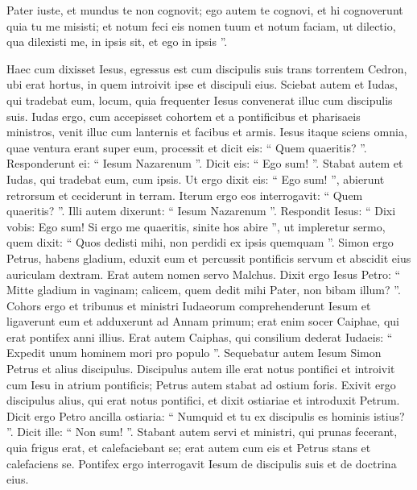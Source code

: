 \begin{biblechapter}
\begin{biblechapter}
\begin{biblechapter}
\begin{biblechapter}
\begin{biblechapter}
\begin{biblechapter}
\begin{biblechapter}
\begin{biblechapter}
\begin{biblechapter}
\begin{biblechapter}
\begin{biblechapter}
\begin{biblechapter}
\begin{biblechapter}
\begin{biblechapter}
\begin{biblechapter}
\begin{biblechapter}
\begin{biblechapter}
 \verse Pater iuste, et mundus te non cognovit; ego autem te cognovi, et hi cognoverunt quia tu me misisti; 
\verse et notum feci eis nomen tuum et notum faciam, ut dilectio, qua dilexisti me, in ipsis sit, et ego in ipsis ”.
 
\begin{biblechapter}
\verse Haec cum dixisset Iesus, egressus est cum discipulis suis trans torrentem Cedron, ubi erat hortus, in quem introivit ipse et discipuli eius. 
\verse Sciebat autem et Iudas, qui tradebat eum, locum, quia frequenter Iesus convenerat illuc cum discipulis suis. 
\verse Iudas ergo, cum accepisset cohortem et a pontificibus et pharisaeis ministros, venit illuc cum lanternis et facibus et armis. 
\verse Iesus itaque sciens omnia, quae ventura erant super eum, processit et dicit eis: “ Quem quaeritis? ”. 
\verse Responderunt ei: “ Iesum Nazarenum ”. Dicit eis: “ Ego sum! ”. Stabat autem et Iudas, qui tradebat eum, cum ipsis. 
\verse Ut ergo dixit eis: “ Ego sum! ”, abierunt retrorsum et ceciderunt in terram. 
\verse Iterum ergo eos interrogavit: “ Quem quaeritis? ”. Illi autem dixerunt: “ Iesum Nazarenum ”. 
\verse Respondit Iesus: “ Dixi vobis: Ego sum! Si ergo me quaeritis, sinite hos abire ”, 
\verse ut impleretur sermo, quem dixit: “ Quos dedisti mihi, non perdidi ex ipsis quemquam ”. 
\verse Simon ergo Petrus, habens gladium, eduxit eum et percussit pontificis servum et abscidit eius auriculam dextram. Erat autem nomen servo Malchus. 
\verse Dixit ergo Iesus Petro: “ Mitte gladium in vaginam; calicem, quem dedit mihi Pater, non bibam illum? ”.
 \verse Cohors ergo et tribunus et ministri Iudaeorum comprehenderunt Iesum et ligaverunt eum 
\verse et adduxerunt ad Annam primum; erat enim socer Caiphae, qui erat pontifex anni illius. 
\verse Erat autem Caiphas, qui consilium dederat Iudaeis: “ Expedit unum hominem mori pro populo ”.
 \verse Sequebatur autem Iesum Simon Petrus et alius discipulus. Discipulus autem ille erat notus pontifici et introivit cum Iesu in atrium pontificis; 
\verse Petrus autem stabat ad ostium foris. Exivit ergo discipulus alius, qui erat notus pontifici, et dixit ostiariae et introduxit Petrum. 
\verse Dicit ergo Petro ancilla ostiaria: “ Numquid et tu ex discipulis es hominis istius? ”. Dicit ille: “ Non sum! ”. 
\verse Stabant autem servi et ministri, qui prunas fecerant, quia frigus erat, et calefaciebant se; erat autem cum eis et Petrus stans et calefaciens se.
 \verse Pontifex ergo interrogavit Iesum de discipulis suis et de doctrina eius. 

\end{biblechapter}
\end{biblechapter}
\end{biblechapter}
\end{biblechapter}
\end{biblechapter}
\end{biblechapter}
\end{biblechapter}
\end{biblechapter}
\end{biblechapter}
\end{biblechapter}
\end{biblechapter}
\end{biblechapter}
\end{biblechapter}
\end{biblechapter}
\end{biblechapter}
\end{biblechapter}
\end{biblechapter}
\end{biblechapter}
